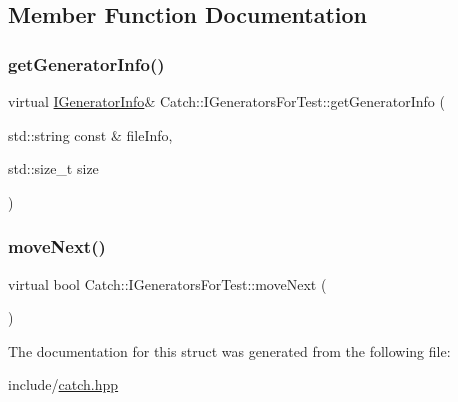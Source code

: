 \subsection{Member Function Documentation}
\mbox{\label{struct_catch_1_1_i_generators_for_test_a180d84e858840188e4c3788e47eefdb0}} 
\subsubsection{\texorpdfstring{get\+Generator\+Info()}{getGeneratorInfo()}}
{\footnotesize\ttfamily virtual \mbox{\hyperlink{struct_catch_1_1_i_generator_info}{I\+Generator\+Info}}\& Catch\+::\+I\+Generators\+For\+Test\+::get\+Generator\+Info (\begin{DoxyParamCaption}\item[{std\+::string const \&}]{file\+Info,  }\item[{std\+::size\+\_\+t}]{size }\end{DoxyParamCaption})\hspace{0.3cm}{\ttfamily [pure virtual]}}

\mbox{\label{struct_catch_1_1_i_generators_for_test_adab31832d529fc584fd63164e0a1c8ad}} 
\subsubsection{\texorpdfstring{move\+Next()}{moveNext()}}
{\footnotesize\ttfamily virtual bool Catch\+::\+I\+Generators\+For\+Test\+::move\+Next (\begin{DoxyParamCaption}{ }\end{DoxyParamCaption})\hspace{0.3cm}{\ttfamily [pure virtual]}}



The documentation for this struct was generated from the following file\+:\begin{DoxyCompactItemize}
\item 
include/\mbox{\hyperlink{catch_8hpp}{catch.\+hpp}}\end{DoxyCompactItemize}
